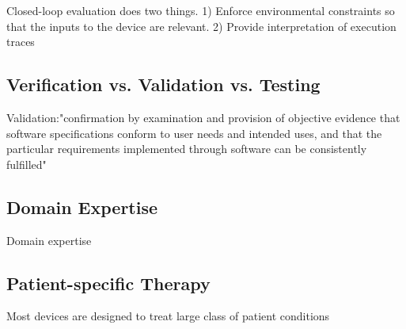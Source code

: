 Closed-loop evaluation does two things. 1) Enforce environmental constraints so that the inputs to the device are relevant. 2) Provide interpretation of execution traces 

\subsection{Verification vs. Validation vs. Testing}

Validation:"confirmation by examination and provision of objective evidence that software specifications conform to user needs and intended uses, and that the particular requirements implemented through software can be consistently fulfilled"\cite{ISO8402,fda2}
\subsection{Domain Expertise}
Domain expertise 
\subsection{Patient-specific Therapy}
Most devices are designed to treat large class of patient conditions


